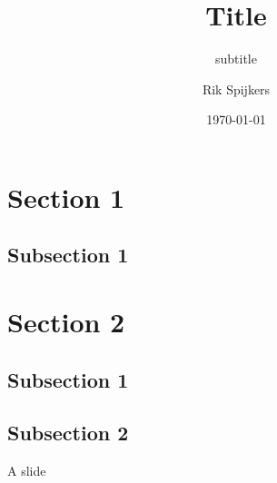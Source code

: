 \documentclass[compress,aspectratio=169]{beamer}
\title{Title}
\subtitle{subtitle}
\author{Rik Spijkers}
\institute{Institute}
\date{\today}
\begin{document}
\begin{frame}
  \maketitle
\end{frame}

\begin{frame}
  \tableofcontents[]
\end{frame}

\section{Section 1}
\subsection{Subsection 1}
\section{Section 2}
\subsection{Subsection 1}
\subsection{Subsection 2}
\begin{frame}{A slide}
  
\end{frame}
\section*{} %

\end{document}
